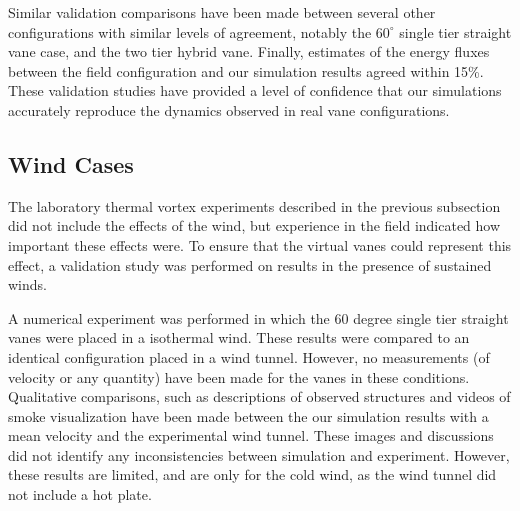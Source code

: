 Similar validation comparisons have been made between several other
configurations with similar levels of agreement,  notably the
$60^{\circ}$ single tier straight vane case, and the two tier hybrid
vane.  Finally, estimates of the energy fluxes between the field
configuration and our simulation results agreed within 15\%. These
validation studies have provided a level of confidence that our
simulations accurately reproduce the dynamics observed in real vane
configurations.

\subsection{Wind Cases}

The laboratory thermal vortex experiments described in the previous
subsection did not include the effects of the wind, but experience in
the field indicated how important these effects were. To ensure that the
virtual vanes could represent this effect, a validation study 
was performed on results in the presence of sustained winds. 

A numerical experiment was performed in which the 60 degree single tier
straight vanes were placed in a isothermal wind.  These results were
compared to an identical configuration placed in a wind tunnel.
However, no measurements (of velocity or any quantity) have been made
for the vanes in these conditions. Qualitative comparisons, such as
descriptions of observed structures and videos of smoke visualization
have been made between the our simulation results with a mean velocity
and the experimental wind tunnel. These images and discussions did not
identify any inconsistencies between simulation and experiment.
However, these results are limited, and are only for the cold wind, as
the wind tunnel did not include a hot plate.  

